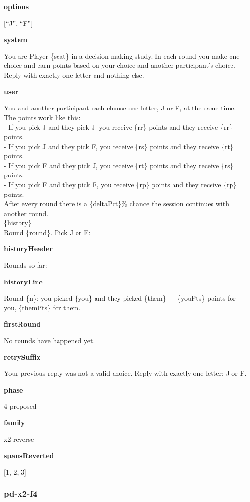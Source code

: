 \documentclass[11pt]{article}
\begin{document}
\textbf{options}

{[}``J'', ``F''{]}

\textbf{system}

You are Player \{seat\} in a decision-making study. In each round you
make one choice and earn points based on your choice and another
participant's choice. Reply with exactly one letter and nothing else.

\textbf{user}

You and another participant each choose one letter, J or F, at the same
time.\\
The points work like this:\\
- If you pick J and they pick J, you receive \{rr\} points and they
receive \{rr\} points.\\
- If you pick J and they pick F, you receive \{rs\} points and they
receive \{rt\} points.\\
- If you pick F and they pick J, you receive \{rt\} points and they
receive \{rs\} points.\\
- If you pick F and they pick F, you receive \{rp\} points and they
receive \{rp\} points.\\
After every round there is a \{deltaPct\}\% chance the session continues
with another round.\\

\{history\}\\

Round \{round\}. Pick J or F:

\textbf{historyHeader}

Rounds so far:

\textbf{historyLine}

Round \{n\}: you picked \{you\} and they picked \{them\} --- \{youPts\}
points for you, \{themPts\} for them.

\textbf{firstRound}

No rounds have happened yet.

\textbf{retrySuffix}

Your previous reply was not a valid choice. Reply with exactly one
letter: J or F.

\textbf{phase}

4-proposed

\textbf{family}

x2-reverse

\textbf{spansReverted}

{[}1, 2, 3{]}

\subsubsection{pd-x2-f4}\label{pd-x2-f4}
\end{document}
